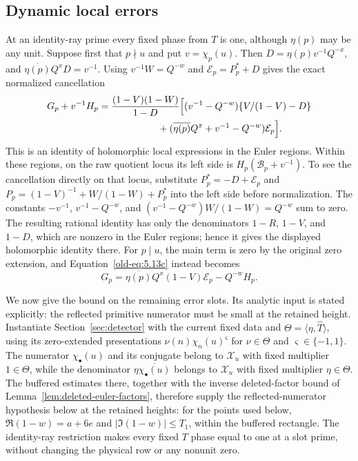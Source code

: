 \documentclass[11pt,a4paper]{article}
\numberwithin{equation}{section}
\numberwithin{figure}{section}
\theoremstyle{definition}
\theoremstyle{remark}
\begin{document}
\subsection{Dynamic local errors}

At an identity-ray prime every fixed phase from $T$ is one, although
$\eta(p)$ may be any unit.  Suppose first that $p\nmid u$ and put
$v=\chi_p(u)$.  Then $D=\eta(p)v^{-1}Q^{-x}$, and
$\overline{\eta(p)}Q^xD=v^{-1}$.  Using
$v^{-1}W=Q^{-w}$ and $\mathcal E_p=P_p^*+D$ gives the exact
normalized cancellation
\begin{equation}\label{old-eq:5.13b}
\begin{split}
 G_p+v^{-1}H_p={}&
 \frac{(1-V)(1-W)}{1-D}
 \Bigl[(v^{-1}-Q^{-w})\{V/(1-V)-D\}\\
 &\hspace{17mm}+(\overline{\eta(p)}Q^x+v^{-1}-Q^{-w})
                    \mathcal E_p\Bigr].
\end{split}
\end{equation}
This is an identity of holomorphic local expressions in the Euler regions.
Within these regions, on the raw quotient locus its left side is
$H_p(\mathcal B_p+v^{-1})$.
To see the cancellation directly on that locus, substitute
$P_p^*=-D+\mathcal E_p$ and
$P_p=(1-V)^{-1}+W/(1-W)+P_p^*$ into the left side before
normalization.  The constants $-v^{-1}$, $v^{-1}-Q^{-w}$, and
$(v^{-1}-Q^{-w})W/(1-W)=Q^{-w}$ sum to zero.
The resulting rational identity has only the denominators $1-R$, $1-V$,
and $1-D$, which are nonzero in the Euler regions; hence it gives the
displayed holomorphic identity there.
For $p\mid u$, the main term is zero by the original zero extension,
and Equation~\eqref{old-eq:5.13c} instead becomes
\[
 G_p=
 \overline{\eta(p)}Q^x(1-V)\mathcal E_p-Q^{-w}H_p.
\]

We now give the bound on the remaining error slots.  Its analytic
input is stated explicitly: the reflected primitive numerator must
be small at the retained height.  Instantiate Section~\ref{sec:detector}
with the current fixed data and $\Theta=\langle\eta,\widehat T\rangle$,
using its zero-extended presentations $\nu(n)\chi_n(u)^\varsigma$ for
$\nu\in\Theta$ and $\varsigma\in\{-1,1\}$.  The
numerator $\chi_\bullet(u)$ and its conjugate belong to $\mathcal X_u$
with fixed multiplier $1\in\Theta$, while the denominator
$\eta\overline{\chi_\bullet(u)}$ belongs to $\mathcal X_u$ with fixed
multiplier $\eta\in\Theta$.  The buffered estimates there, together with
the inverse deleted-factor bound of Lemma~\ref{lem:deleted-euler-factors},
therefore supply the reflected-numerator hypothesis below at the retained
heights: for the points used below, $\Re(1-w)=a+6e$ and
$|\Im(1-w)|\le T_1$, within the buffered rectangle.  The identity-ray
restriction makes every fixed $T$ phase equal to one at a
slot prime, without changing the physical row or any nonunit zero.
\end{document}

